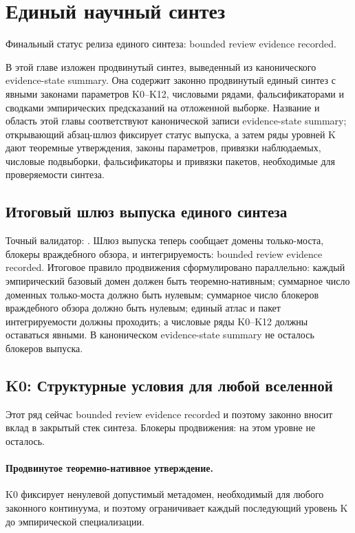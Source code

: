 \section{Единый научный синтез}
\label{sec:oc-core-1-3-unified-synthesis}
Финальный статус релиза единого синтеза: bounded review evidence recorded.

В этой главе изложен продвинутый синтез, выведенный из канонического evidence-state summary. Она содержит законно продвинутый единый синтез с явными законами параметров K0--K12, числовыми рядами, фальсификаторами и сводками эмпирических предсказаний на отложенной выборке.
Название и область этой главы соответствуют канонической записи evidence-state summary; открывающий абзац-шлюз фиксирует статус выпуска, а затем ряды уровней K дают теоремные утверждения, законы параметров, привязки наблюдаемых, числовые подвыборки, фальсификаторы и привязки пакетов, необходимые для проверяемости синтеза.

\subsection{Итоговый шлюз выпуска единого синтеза}
Точный валидатор: .
Шлюз выпуска теперь сообщает  домены только-моста,  блокеры враждебного обзора, и интегрируемость: bounded review evidence recorded.
Итоговое правило продвижения сформулировано параллельно: каждый эмпирический базовый домен должен быть теоремно-нативным; суммарное число доменных только-моста должно быть нулевым; суммарное число блокеров враждебного обзора должно быть нулевым; единый атлас и пакет интегрируемости должны проходить; а числовые ряды K0--K12 должны оставаться явными.
В каноническом evidence-state summary не осталось блокеров выпуска.

\subsection{K0: Структурные условия для любой вселенной}
\label{sec:oc-core-1-3-synthesis-k0}
Этот ряд сейчас bounded review evidence recorded и поэтому законно вносит вклад в закрытый стек синтеза.
Блокеры продвижения: на этом уровне не осталось.

\paragraph{Продвинутое теоремно-нативное утверждение.}
K0 фиксирует ненулевой допустимый метадомен, необходимый для любого законного континуума, и поэтому ограничивает каждый последующий уровень K до эмпирической специализации.

